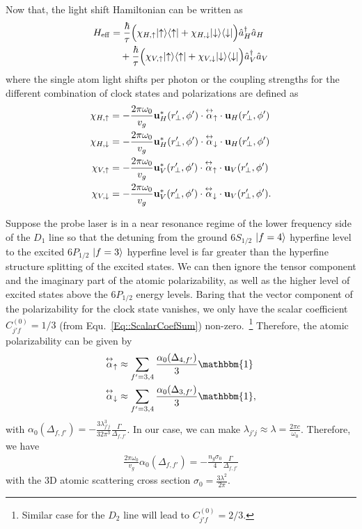 Now that, the light shift Hamiltonian can be written as 
\begin{align}
H_{\rm eff} & = \frac{ \hbar }{ \tau}\Big( \chi_{H,\uparrow}\op{\uparrow}{\uparrow} +  \chi_{H,\downarrow} \op{\downarrow}{\downarrow} \Big) \hat{a}_H\dg \hat{a}_H \nonumber\\
&\quad +  \frac{ \hbar }{ \tau} \Big( \chi_{V,\uparrow}\op{\uparrow}{\uparrow} +  \chi_{V,\downarrow} \op{\downarrow}{\downarrow} \Big) \hat{a}_V\dg \hat{a}_V  \label{HeffLS}
\end{align}
where the single atom light shifts per photon or the coupling strengths for the different combination of clock states and polarizations are defined as
\begin{align}
\chi_{H,\uparrow} &=  -\frac{2\pi\omega_0}{v_g} \mathbf{u}^*_{H}(r^\prime\!\!_\perp,\phi') \cdot\tensor{\alpha}_{\uparrow}\cdot \mathbf{u}_{H}(r^\prime\!\!_\perp,\phi') \\
\chi_{H,\downarrow} &=  -\frac{2\pi\omega_0}{v_g} \mathbf{u}^*_{H}(r^\prime\!\!_\perp,\phi') \cdot\tensor{\alpha}_{\downarrow}\cdot \mathbf{u}_{H}(r^\prime\!\!_\perp,\phi') \\
\chi_{V,\uparrow} &=  -\frac{2\pi\omega_0}{v_g}  \mathbf{u}^*_{V}(r^\prime\!\!_\perp,\phi') \cdot\tensor{\alpha}_{\uparrow}\cdot \mathbf{u}_{V}(r^\prime\!\!_\perp,\phi')  \\
\chi_{V,\downarrow} &=  -\frac{2\pi\omega_0}{v_g}  \mathbf{u}^*_{V}(r^\prime\!\!_\perp,\phi') \cdot\tensor{\alpha}_{\downarrow}\cdot \mathbf{u}_{V}(r^\prime\!\!_\perp,\phi'). 
\end{align}

Suppose the probe laser is in a near resonance regime of the lower frequency side of the $ D_1 $ line so that the detuning from the ground $ 6S_{1/2} $ $ \lvert{f=4}\rangle $ hyperfine level to the excited $ 6P_{1/2} $ $ \lvert{f=3}\rangle $ hyperfine level is far greater than the hyperfine structure splitting of the excited states. We can then ignore the tensor component and the imaginary part of the atomic polarizability, as well as the higher level of excited states above the $ 6P_{1/2} $ energy levels. Baring that the vector component of the polarizability for the clock state vanishes, we only have the scalar coefficient $C_{j' f}^{(0)} =1/3  $ (from Equ.~\eqref{Eq::ScalarCoefSum}) non-zero.~\footnote{Similar case for the $ D_2 $ line will lead to $ C_{j' f}^{(0)} =2/3 $.} Therefore, the atomic polarizability can be given by
\begin{align}
\tensor{\alpha}_{\uparrow} &\approx\sum_{f'=3,4}\frac{\alpha_0(\Delta_{4,f'})}{3}\mathbbm{1} \\
\tensor{\alpha}_{\downarrow} &\approx\sum_{f'=3,4}\frac{\alpha_0(\Delta_{3,f'})}{3}\mathbbm{1},
\end{align}
with $ \alpha_0(\Delta_{f,f'})=-\frac{3\lambda_{j'j}^3}{32\pi^3} \frac{\Gamma}{\Delta_{f,f'}} $. In our case, we can make $ \lambda_{j'j}\approx\lambda= \frac{2\pi c}{\omega_0}$. Therefore, we have
\begin{align}
\frac{2\pi\omega_0}{v_g}\alpha_0(\Delta_{f,f'})=-\frac{n_g\sigma_0}{4} \frac{\Gamma}{\Delta_{f,f'}}
\end{align}
with the 3D atomic scattering cross section $ \sigma_0= \frac{3\lambda^2}{2\pi}  $. 

